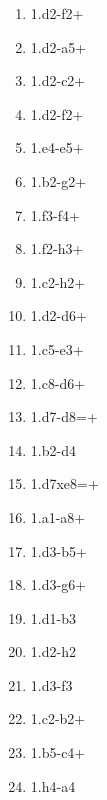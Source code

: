 \begin{enumerate}
\setcounter{enumi}{\value{d_counter}}
\item 1.\queen{}d2-f2+
\item 1.\queen{}d2-a5+
\item 1.\queen{}d2-c2+
\item 1.\queen{}d2-f2+
\item 1.\rook{}e4-e5+
\item 1.\rook{}b2-g2+

\item 1.\pawn{}f3-f4+
\item 1.\knight{}f2-h3+
\item 1.\queen{}c2-h2+
\item 1.\queen{}d2-d6+
\item 1.\bishop{}c5-e3+
\item 1.\knight{}c8-d6+

\item 1.\pawn{}d7-d8=\knight+
\item 1.\bishop{}b2-d4
\item 1.\pawn{}d7xe8=\knight+
\item 1.\rook{}a1-a8+
\item 1.\bishop{}d3-b5+
\item 1.\bishop{}d3-g6+

\item 1.\bishop{}d1-b3
\item 1.\queen{}d2-h2
\item 1.\rook{}d3-f3
\item 1.\rook{}c2-b2+
\item 1.\bishop{}b5-c4+
\item 1.\rook{}h4-a4
\setcounter{d_counter}{\value{enumi}}
\end{enumerate}